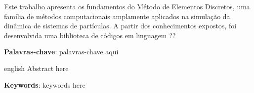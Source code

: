 \setlength{\absparsep}{18pt} %
\begin{resumo}
	Este trabalho apresenta os fundamentos do Método de Elementos Discretos, uma família de métodos computacionais amplamente aplicados na simulação da dinâmica de sistemas de partículas. A partir dos conhecimentos expostos, foi desenvolvida uma biblioteca de códigos em linguagem \CPP{} \alert{??}

   \vspace{\onelineskip}
 
   \noindent 
   \textbf{Palavras-chave}: \alert{palavras-chave aqui}
\end{resumo}

\begin{resumo}[Abstract]
 \begin{otherlanguage*}{english}
   \alert{Abstract here}

   \vspace{\onelineskip}
 
   \noindent 
   \textbf{Keywords}: \alert{keywords here}
 \end{otherlanguage*}
\end{resumo}

%



 
